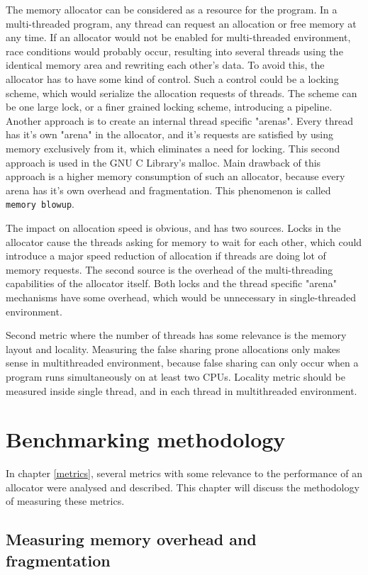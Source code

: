 The memory allocator can be considered as a resource for the program. In a multi-threaded program, any thread can request an allocation or free memory at any time. If an allocator would not be enabled for multi-threaded environment, race conditions would probably occur, resulting into several threads using the identical memory area and rewriting each other's data. To avoid this, the allocator has to have some kind of control. Such a control could be a locking scheme, which would serialize the allocation requests of threads. The scheme can be one large lock, or a finer grained locking scheme, introducing a pipeline. Another approach is to create an internal thread specific "arenas". Every thread has it's own "arena" in the allocator, and it's requests are satisfied by using memory exclusively from it, which eliminates a need for locking. This second approach is used in the GNU C Library's malloc. Main drawback of this approach is a higher memory consumption of such an allocator, because every arena has it's own overhead and fragmentation. This phenomenon is called {\tt memory blowup}.

The impact on allocation speed is obvious, and has two sources. Locks in the allocator cause the threads asking for memory to wait for each other, which could introduce a major speed reduction of allocation if threads are doing lot of memory requests. The second source is the overhead of the multi-threading capabilities of the allocator itself. Both locks and the thread specific "arena" mechanisms have some overhead, which would be unnecessary in single-threaded environment.

Second metric where the number of threads has some relevance is the memory layout and locality. Measuring the false sharing prone allocations only makes sense in multithreaded environment, because false sharing can only occur when a program runs simultaneously on at least two CPUs. Locality metric should be measured inside single thread, and in each thread in multithreaded environment.

\chapter{Benchmarking methodology}
\label{methodology}

In chapter \ref{metrics}, several metrics with some relevance to the performance of an allocator were analysed and described. This chapter will discuss the methodology of measuring these metrics.

\section{Measuring memory overhead and fragmentation}
\label{methodology:fragmentation}

